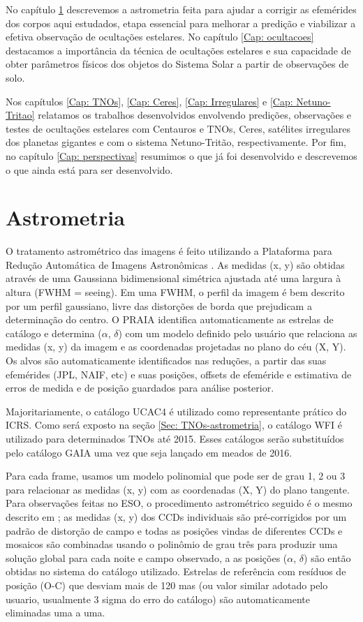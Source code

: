 \documentclass[12pt,a4paper]{monografia}
\begin{document}
No capítulo \ref{Cap: Astrometria} descrevemos a astrometria feita para ajudar a corrigir as efemérides dos corpos aqui estudados, etapa essencial para melhorar a predição e viabilizar a efetiva observação de ocultações estelares. No capítulo \ref{Cap: ocultacoes} destacamos a importância da técnica de ocultações estelares e sua capacidade de obter parâmetros físicos dos objetos do Sistema Solar a partir de observações de solo.

Nos capítulos \ref{Cap: TNOs}, \ref{Cap: Ceres}, \ref{Cap: Irregulares} e \ref{Cap: Netuno-Tritao} relatamos os trabalhos desenvolvidos envolvendo predições, observações e testes de ocultações estelares com Centauros e TNOs, Ceres, satélites irregulares dos planetas gigantes e com o sistema Netuno-Tritão, respectivamente. Por fim, no capítulo \ref{Cap: perspectivas} resumimos o que já foi desenvolvido e descrevemos o que ainda está para ser desenvolvido.


\chapter{Astrometria}
\label{Cap: Astrometria}


\indent \indent O tratamento astrométrico das imagens é feito utilizando a Plataforma para Redução Automática de Imagens Astronômicas \citep[PRAIA][]{Assafin2011}. As medidas (x, y) são obtidas através de uma Gaussiana bidimensional simétrica ajustada até uma largura à altura (FWHM = seeing). Em uma FWHM, o perfil da imagem é bem descrito por um perfil gaussiano, livre das distorções de borda que prejudicam a determinação do centro. O PRAIA identifica automaticamente as estrelas de catálogo e determina ($\alpha$, $\delta$) com um modelo definido pelo usuário que relaciona as medidas (x, y) da imagem e as coordenadas projetadas no plano do céu (X, Y). Os alvos são automaticamente identificados nas reduções, a partir das suas efemérides (JPL, NAIF, etc) e suas posições, offsets de efeméride e estimativa de erros de medida e de posição guardados para análise posterior.

Majoritariamente, o catálogo UCAC4 \citep{Zacharias2013} é utilizado como representante prático do ICRS. Como será exposto na seção \ref{Sec: TNOs-astrometria}, o catálogo WFI é utilizado para determinados TNOs até 2015. Esses catálogos serão substituídos pelo catálogo GAIA uma vez que seja lançado em meados de 2016.

Para cada frame, usamos um modelo polinomial que pode ser de grau 1, 2 ou 3 para relacionar as medidas (x, y) com as coordenadas (X, Y) do plano tangente. Para observações feitas no ESO, o procedimento astrométrico seguido é o mesmo descrito em \citep{Assafin2012}; as medidas (x, y) dos CCDs individuais são pré-corrigidos por um padrão de distorção de campo e todas as posições vindas de diferentes CCDs e mosaicos são combinadas usando o polinômio de grau três para produzir uma solução global para cada noite e campo observado, a as posições ($\alpha$, $\delta$) são então obtidas no sistema do catálogo utilizado. Estrelas de referência com resíduos de posição (O-C) que desviam mais de 120 mas (ou valor similar adotado pelo usuario, usualmente 3 sigma do erro do catálogo) são automaticamente eliminadas uma a uma.
\end{document}
